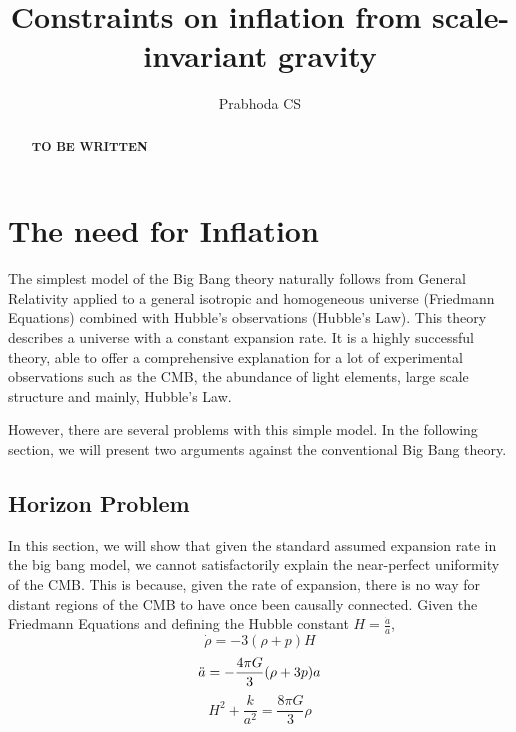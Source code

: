\documentclass[aps,prd,reprint,preprintnumbers,showpacs,floatfix,nofootinbib,superscript address]{revtex4-2}
\begin{document}
\title{Constraints on inflation from scale-invariant gravity}

\author{Prabhoda CS}

\begin{abstract}

\textbf{TO BE WRITTEN}

\end{abstract}

\maketitle


\section{The need for Inflation}\label{The need for Inflation}

\indent The simplest model of the Big Bang theory naturally follows from General Relativity applied to a general isotropic and homogeneous universe (Friedmann Equations) combined with Hubble's observations (Hubble's Law). This theory describes a universe with a constant expansion rate. It is a highly successful theory, able to offer a comprehensive explanation for a lot of experimental observations such as the CMB, the abundance of light elements, large scale structure and mainly, Hubble's Law.

However, there are several problems with this simple model. In the following section, we will present two arguments against the conventional Big Bang theory.

\subsection{Horizon Problem}
In this section, we will show that given the standard assumed expansion rate in the big bang model, we cannot satisfactorily explain the near-perfect uniformity of the CMB. This is because, given the rate of expansion, there is no way for distant regions of the CMB to have once been causally connected.
Given the Friedmann Equations and defining the Hubble constant $H = \frac{\dot{a}}{a}$,
\begin{equation} \label{1}
    \dot{\rho} = -3(\rho + p)H
\end{equation}
\begin{equation} \label{2}
    \Ddot{a} = -\frac{4\pi G}{3} (\rho + 3p)a
\end{equation}
\begin{equation}    \label{3}
    H^2 + \frac{k}{a^2} = \frac{8 \pi G}{3} \rho
\end{equation}
\end{document}
